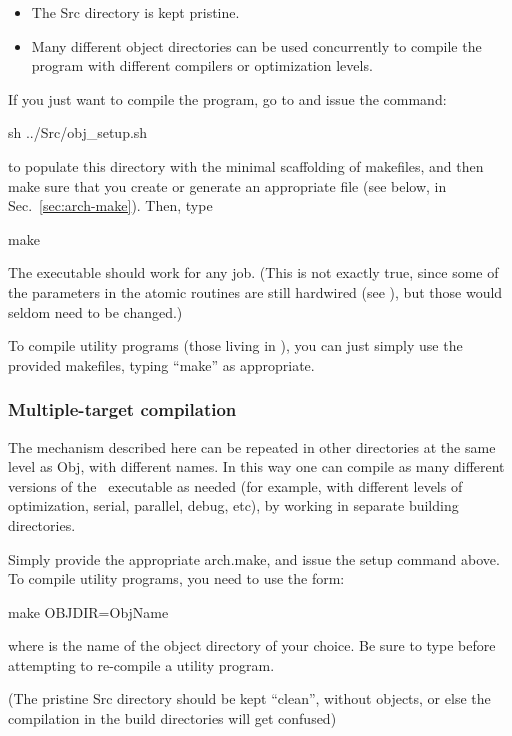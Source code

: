 \begin{itemize}
\item The Src directory is kept pristine.
\item Many different object directories can be used concurrently to
  compile the program with different compilers or optimization levels.
\end{itemize}

If you just want to compile the program, go to  and issue the
command:
\begin{shellexample}
  sh ../Src/obj_setup.sh
\end{shellexample}
to populate this directory with the minimal scaffolding of makefiles,
and then make sure that you create or generate an appropriate 
file (see below, in Sec.~\ref{sec:arch-make}). Then, type
\begin{shellexample}
  make
\end{shellexample}
The executable should work for any job. (This is not exactly true,
since some of the parameters in the atomic routines are still
hardwired (see ), but those would seldom need to
be changed.)

To compile utility programs (those living in ), you can just
simply use the provided makefiles, typing ``make'' as appropriate.

\subsubsection{Multiple-target compilation}

The mechanism described here can be repeated in other directories at
the same level as Obj, with different names. In this way one can
compile as many different versions of the \siesta\ executable as
needed (for example, with different levels of optimization, serial,
parallel, debug, etc), by working in separate building directories.

Simply provide the appropriate arch.make, and issue the setup command
above. To compile utility programs, you need to use the form:
\begin{shellexample}
   make OBJDIR=ObjName
\end{shellexample}
where  is the name of the object directory of your
choice. Be sure to type  before attempting to
re-compile a utility program.

(The pristine Src directory should be kept ``clean'', without objects, or else
the compilation in the build directories will get confused)


